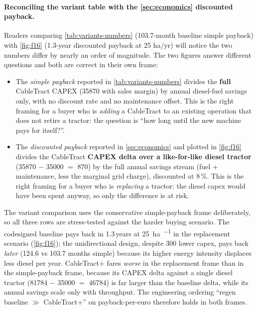 \documentclass[11pt,a4paper]{article}
\begin{document}
\paragraph{Reconciling the variant table with the \cref{sec:economics} discounted payback.} Readers comparing \cref{tab:variants-numbers} (103.7-month baseline simple payback) with \cref{fig:f16} (1.3-year discounted payback at 25 ha/yr) will notice the two numbers differ by nearly an order of magnitude. The two figures answer different questions and both are correct in their own frame:
\begin{itemize}[leftmargin=1.6em,itemsep=0.15em]
    \item The \emph{simple payback} reported in \cref{tab:variants-numbers} divides the \textbf{full} CableTract CAPEX (\SI{35870}{\EUR} with sales margin) by annual diesel-fuel savings only, with no discount rate and no maintenance offset. This is the right framing for a buyer who is \emph{adding} a CableTract to an existing operation that does not retire a tractor: the question is ``how long until the new machine pays for itself?''.
    \item The \emph{discounted payback} reported in \cref{sec:economics} and plotted in \cref{fig:f16} divides the CableTract \textbf{CAPEX delta over a like-for-like diesel tractor} (\SI{35870}{\EUR} $-$ \SI{35000}{\EUR} $=$ \SI{870}{\EUR}) by the full annual savings stream (fuel + maintenance, less the marginal grid charge), discounted at 8\,\%. This is the right framing for a buyer who is \emph{replacing} a tractor: the diesel capex would have been spent anyway, so only the difference is at risk.
\end{itemize}
The variant comparison uses the conservative simple-payback frame deliberately, so all three rows are stress-tested against the harder buying scenario. The codesigned baseline pays back in 1.3\,years at \SI{25}{\hectare\per\year} in the replacement scenario (\cref{fig:f16}); the unidirectional design, despite \SI{300}{\EUR} lower capex, pays back \emph{later} (124.6 vs 103.7 months simple) because its higher energy intensity displaces less diesel per year. CableTract+ fares \emph{worse} in the replacement frame than in the simple-payback frame, because its CAPEX delta against a single diesel tractor (\SI{81784}{\EUR} $-$ \SI{35000}{\EUR} $=$ \SI{46784}{\EUR}) is far larger than the baseline delta, while its annual savings scale only with throughput. The engineering ordering ``regen baseline $\gg$ CableTract+'' on payback-per-euro therefore holds in both frames.
\end{document}

